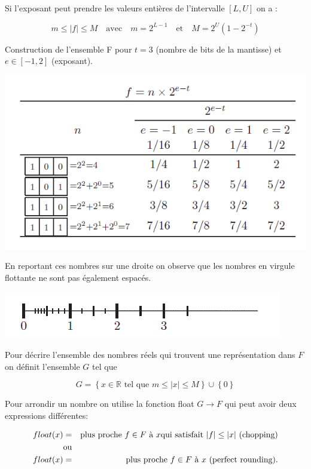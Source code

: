 \documentclass[10pt,fleqn]{article} %
\begin{document}
Si l’exposant peut prendre les valeurs entières de l’intervalle $[L, U]$ on a :

$$
m\leq |f|\leq M \quad \text{avec} \quad m=2^{L-1} \quad \text{et}\quad  M=2^U\left(1-2^{-t}\right)
$$



\begin{exemple}
Construction de l’ensemble F pour $t = 3$ (nombre de bits de la mantisse) et $e \in [-1, 2]$ (exposant).

\begin{center}
\includegraphics[width=.5\textwidth]{images/eps1.png}
\label{}
\end{center}

En reportant ces nombres sur une droite on observe que les nombres en virgule flottante
ne sont pas également espacés.

\begin{center}
\includegraphics[width=.5\textwidth]{images/eps4.png}
\end{center}

\end{exemple}

Pour décrire l’ensemble des nombres réels qui trouvent une représentation dans $F$
on définit l’ensemble $G$ tel que 


$$
G=\left\{ x\in \mathbb{R} \text{ tel que } m\leq |x| \leq M \right\} \cup \left\{ 0 \right\}
$$


Pour arrondir un nombre on utilise la fonction float $G \rightarrow F$ qui peut avoir deux expressions différentes:

\begin{eqnarray*}
float (x) &=& \hbox{plus proche } f \in F \hbox{ à } x \hbox{qui satisfait } |f| \leq |x| \hbox{ (chopping)}\\
&\hbox{ou}&\\
float (x) &=& \hbox{plus proche } f \in F \hbox{ à } x \hbox{ (perfect rounding)}.
\end{eqnarray*}
\end{document}
